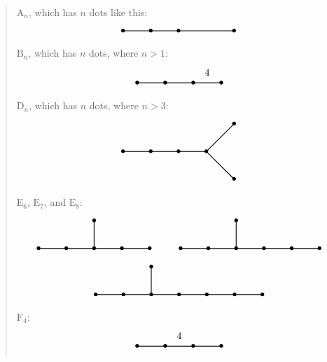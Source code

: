 \documentclass{article}
\begin{document}
\begin{quote}
\(\mathrm{A}_n\), which has \(n\) dots like this: \[
  \begin{tikzpicture}
    \draw[thick] (0,0) node{$\bullet$} to (1,0) node{$\bullet$} to (2,0) node {$\bullet$} to (4,0) node{$\bullet$};
  \end{tikzpicture}
\] \(\mathrm{B}_n\), which has \(n\) dots, where \(n > 1\): \[
  \begin{tikzpicture}
    \draw[thick] (0,0) node{$\bullet$} to (1,0) node{$\bullet$} to (2,0) node{$\bullet$} to node[label=above:{4}]{} (3,0) node {$\bullet$};
  \end{tikzpicture}
\] \(\mathrm{D}_n\), which has \(n\) dots, where \(n > 3\): \[
  \begin{tikzpicture}
    \draw[thick] (0,0) node{$\bullet$} to (1,0) node{$\bullet$} to (2,0) node{$\bullet$} to (3,0) node {$\bullet$};
    \draw[thick] (3,0) to (4,1) node {$\bullet$};
    \draw[thick] (3,0) to (4,-1) node {$\bullet$};
  \end{tikzpicture}
\] \(\mathrm{E}_6\), \(\mathrm{E}_7\), and \(\mathrm{E}_8\): \[
  \begin{gathered}
    \begin{tikzpicture}
      \draw[thick] (0,0) node{$\bullet$} to (1,0) node{$\bullet$} to (2,0) node{$\bullet$} to (3,0) node {$\bullet$} to (4,0) node {$\bullet$};
      \draw[thick] (2,0) to (2,1) node{$\bullet$};
    \end{tikzpicture}
    \qquad
    \begin{tikzpicture}
      \draw[thick] (0,0) node{$\bullet$} to (1,0) node{$\bullet$} to (2,0) node{$\bullet$} to (3,0) node {$\bullet$} to (4,0) node {$\bullet$} to (5,0) node {$\bullet$};
      \draw[thick] (2,0) to (2,1) node{$\bullet$};
    \end{tikzpicture}
  \\\begin{tikzpicture}
      \draw[thick] (0,0) node{$\bullet$} to (1,0) node{$\bullet$} to (2,0) node{$\bullet$} to (3,0) node {$\bullet$} to (4,0) node {$\bullet$} to (5,0) node {$\bullet$} to (6,0) node {$\bullet$};
      \draw[thick] (2,0) to (2,1) node{$\bullet$};
    \end{tikzpicture}
  \end{gathered}
\] \(\mathrm{F}_4\): \[
  \begin{tikzpicture}
    \draw[thick] (0,0) node{$\bullet$} to (1,0) node{$\bullet$} to node[label=above:{4}]{} (2,0) node{$\bullet$} to (3,0) node {$\bullet$};
  \end{tikzpicture}
\]
\end{quote}
\end{document}
